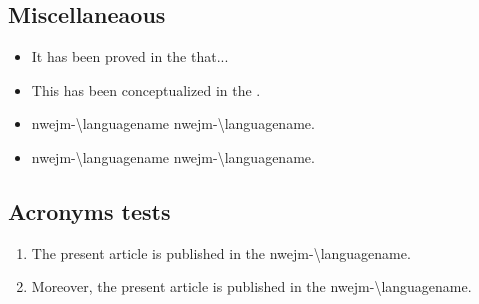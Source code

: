 \documentclass[ngerman]{nwejmart}
\begin{document}
\subsection{Miscellaneaous}
\begin{itemize}
\item It has been proved in the  
  that...
\item This has been conceptualized in the  .
\item \acrshort{nwejm-\languagename} \ie{} \acrlong*{nwejm-\languagename}.
\item \acrshort{nwejm-\languagename} \ie*{} \acrlong*{nwejm-\languagename}.
\end{itemize}
%
\subsection{Acronyms tests}
\begin{enumerate}
\item The present article is published in the \gls{nwejm-\languagename}.
\item Moreover, the present article is published in the \gls{nwejm-\languagename}.
\end{enumerate}
%
\end{document}
